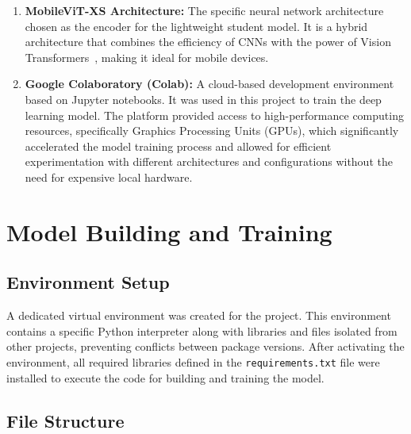 \begin{enumerate}
    \item \textbf{MobileViT-XS Architecture:} The specific neural network architecture chosen as the encoder for the lightweight student model. It is a hybrid architecture that combines the efficiency of CNNs with the power of Vision Transformers~\cite{mehta2021mobilevit}, making it ideal for mobile devices.
    \item \textbf{Google Colaboratory (Colab):} A cloud-based development environment based on Jupyter notebooks. It was used in this project to train the deep learning model. The platform provided access to high-performance computing resources, specifically Graphics Processing Units (GPUs), which significantly accelerated the model training process and allowed for efficient experimentation with different architectures and configurations without the need for expensive local hardware.
\end{enumerate}

\section{Model Building and Training}
\label{sec:model_building}

\subsection{Environment Setup}
\label{subsec:env_setup}

A dedicated virtual environment was created for the project. This environment contains a specific Python interpreter along with libraries and files isolated from other projects, preventing conflicts between package versions. After activating the environment, all required libraries defined in the \texttt{requirements.txt} file were installed to execute the code for building and training the model.

\subsection{File Structure}
\label{subsec:file_structure}

